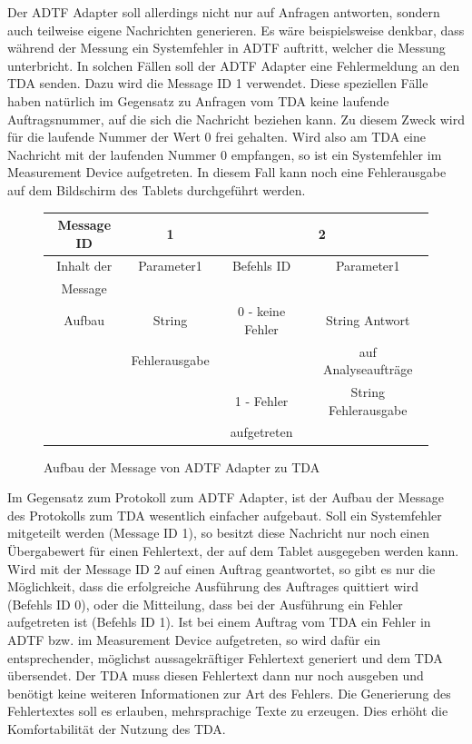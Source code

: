 \documentclass[12pt,a4paper]{report}
\begin{document}
Der ADTF Adapter soll allerdings nicht nur auf Anfragen antworten, sondern auch teilweise eigene Nachrichten generieren. Es wäre beispielsweise denkbar, dass während der Messung ein Systemfehler in ADTF auftritt, welcher die Messung unterbricht. In solchen Fällen soll der ADTF Adapter eine Fehlermeldung an den TDA senden. Dazu wird die Message ID 1 verwendet. Diese speziellen Fälle haben natürlich im Gegensatz zu Anfragen vom TDA keine laufende Auftragsnummer, auf die sich die Nachricht beziehen kann. Zu diesem Zweck wird für die laufende Nummer der Wert 0 frei gehalten. Wird also am TDA eine Nachricht mit der laufenden Nummer 0 empfangen, so ist ein Systemfehler im Measurement Device aufgetreten. In diesem Fall kann noch eine Fehlerausgabe auf dem Bildschirm des Tablets durchgeführt werden.
\begin{figure}[H]
\begin{center}
\begin{tabular}{|c||*{3}{c|}}
\hline
Message ID & 1 & \multicolumn{2}{c|}{2} \\
\hline
Inhalt der& Parameter1 & Befehls ID & Parameter1 \\
Message & & &\\
\hline
Aufbau & String & 0 - keine Fehler & String Antwort \\
 & Fehlerausgabe & & auf Analyseaufträge \\
 & & 1 - Fehler & String Fehlerausgabe \\
 & & aufgetreten & \\
\hline
\end{tabular}
\caption{Aufbau der Message von ADTF Adapter zu TDA}\label{tab:Aufbau der Message von ADTF Adapter zu TDA}
\end{center}
\end{figure}
\noindent Im Gegensatz zum Protokoll zum ADTF Adapter, ist der Aufbau der Message des Protokolls zum TDA wesentlich einfacher aufgebaut. Soll ein Systemfehler mitgeteilt werden (Message ID 1), so besitzt diese Nachricht nur noch einen Übergabewert für einen Fehlertext, der auf dem Tablet ausgegeben werden kann. Wird mit der Message ID 2 auf einen Auftrag geantwortet, so gibt es nur die Möglichkeit, dass die erfolgreiche Ausführung des Auftrages quittiert wird (Befehls ID 0), oder die Mitteilung, dass bei der Ausführung ein Fehler aufgetreten ist (Befehls ID 1). Ist bei einem Auftrag vom TDA ein Fehler in ADTF bzw. im Measurement Device aufgetreten, so wird dafür ein entsprechender, möglichst aussagekräftiger Fehlertext generiert und dem TDA übersendet. Der TDA muss diesen Fehlertext dann nur noch ausgeben und benötigt keine weiteren Informationen zur Art des Fehlers. Die Generierung des Fehlertextes soll es erlauben, mehrsprachige Texte zu erzeugen. Dies erhöht die Komfortabilität der Nutzung des TDA.
\end{document}
